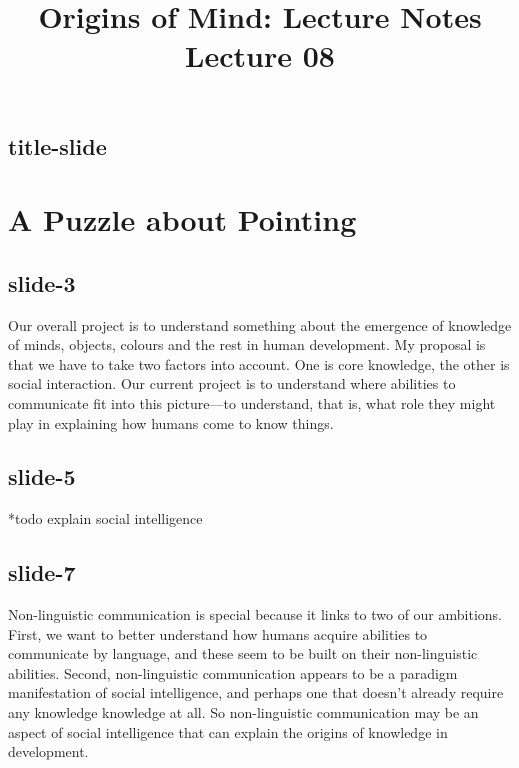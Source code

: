 \documentclass[12pt,\papersize]{extarticle}
\begin{document}
\setlength\footnotesep{1em}








\title {Origins of Mind: Lecture Notes \\ Lecture 08}
 
\maketitle
 
 
\subsection{title-slide}
 
\section{A Puzzle about Pointing}
 
 
\subsection{slide-3}
Our overall project is to understand something about the emergence of knowledge of minds, objects, colours and the rest in human development.
My proposal is that we have to take two factors into account. One is core knowledge, the other is social interaction.
Our current project is to understand where abilities to communicate fit into this picture---to understand, that is, what role they might play in explaining how humans come to know things.
 
 
\subsection{slide-5}
*todo explain social intelligence
 
 
\subsection{slide-7}
Non-linguistic communication is special because it links to two of our ambitions.
First, we want to better understand how humans acquire abilities to communicate by language, and these seem to be built on their non-linguistic abilities.
Second, non-linguistic communication appears to be a paradigm manifestation of social intelligence, and perhaps one that doesn't already require any knowledge knowledge at all.
So non-linguistic communication may be an aspect of social intelligence that can explain the origins of knowledge in development.
 
\end{document}
